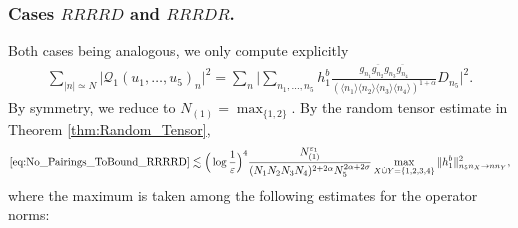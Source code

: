 \documentclass[11pt, xcolor = dvipsnames,reqno
]{amsart}
\theoremstyle{definition}
\theoremstyle{remark}
\begin{document}
\subsubsection{Cases $RRRRD$ and $RRRDR$.}
Both cases being analogous, we only compute explicitly
\begin{align}\label{eq:No_Pairings_ToBound_RRRRD}
    \sum_{|n| \simeq N}  \big| \mathcal{Q}_1(u_1, \ldots, u_5)_n \big|^2 
    = \sum_n 
    \Bigg| \sum_{n_1, \ldots, n_5 } h^b_1 
    \frac{g_{n_1} \overline{g_{n_2}} g_{n_3} \overline{g_{n_4}} }{ (\langle n_1 \rangle \langle n_2 \rangle\langle n_3 \rangle \langle n_4 \rangle)^{1+\alpha}} D_{n_5} \Bigg|^2.
\end{align}
By symmetry, we reduce to $N_{(1)} = \max_{\{1,2\}}$. By the random tensor estimate in Theorem \ref{thm:Random_Tensor},
    \begin{align*}
        \eqref{eq:No_Pairings_ToBound_RRRRD} 
        \lesssim \Big(\log \frac{1}{\varepsilon} \Big)^4 \frac{N_{(1)}^{\varepsilon_1}}{ (N_1N_2N_3N_4)^{2 + 2\alpha} N_5^{2\alpha + 2\sigma}} \max_{X \dot{\cup} Y = \{1,2,3,4\}} \|h^b_1\|_{n_5n_X \rightarrow nn_Y}^2, 
    \end{align*}
    where the maximum is taken among the following estimates for the operator norms: 
\end{document}
